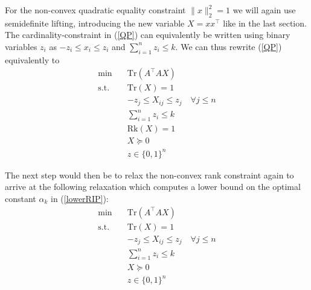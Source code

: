 \documentclass[a4paper,11pt,1p]{elsarticle}
\newcommand{\Norm}[2]{\lVert{#1}\rVert_{#2}}
\newcommand{\T}{^{\top}}
\newcommand{\Tr}{\text{Tr}}
\newcommand{\Rk}{\text{Rk}}
\begin{document}
For the non-convex quadratic equality constraint $\Norm{x}{2}^2 = 1$ we will
again use semidefinite lifting, introducing the new variable $X=xx\T$ like in the last section. 
The cardinality-constraint in (\ref{QP}) can equivalently be written using binary variables $z_i$ as $-z_i \leq x_i \leq z_i$ and $\sum_{i=1}^n z_i \leq k$. We can thus rewrite (\ref{QP}) equivalently to
% 
% 
\begin{align}\label{Rk1MISDP}
 \min \quad & \Tr(A\T A X) \nonumber \\
 \text{s.t.} \quad & \Tr(X) = 1 \nonumber \\
 & -z_j \leq X_{ij} \leq z_j \quad \forall j \leq n \nonumber \\
 & \sum_{i=1}^n z_i \leq k \tag{Rk1MISDP} \\
 & \Rk(X) = 1 \nonumber \\
 & X \succeq 0  \nonumber \\
 & z \in \{0,1\}^n \nonumber
\end{align}

The next step would then be to relax the non-convex rank constraint again to arrive at the following relaxation which computes a lower bound on the optimal constant $\alpha_k$ in (\ref{lowerRIP}):
\begin{align}\label{MISDP}
 \min \quad & \Tr(A\T A X) \nonumber \\
 \text{s.t.} \quad & \Tr(X) = 1 \nonumber \\
 & -z_j \leq X_{ij} \leq z_j \quad \forall j \leq n \nonumber \\
 & \sum_{i=1}^n z_i \leq k \tag{MISDP} \\
 & X \succeq 0  \nonumber \\
 & z \in \{0,1\}^n \nonumber
\end{align}
\end{document}
